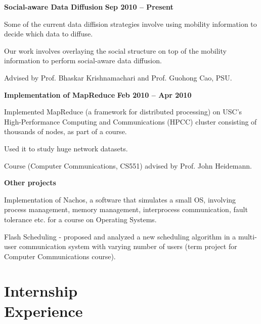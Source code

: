 \documentclass[margin,line]{resume}
\begin{document}
\begin{resume}
  \textbf{Social-aware Data Diffusion} \hfill \textbf{Sep 2010 -- Present}
  \begin{list2}
   \item Some of the current data diffision strategies involve using mobility information to decide which data to diffuse. 
  \newpage
   \item Our work involves overlaying the social structure on top of the mobility information to perform social-aware data diffusion.
   \item Advised by Prof. Bhaskar Krishnamachari and Prof. Guohong Cao, PSU.
  \end{list2}

  \textbf{Implementation of MapReduce} \hfill \textbf{Feb 2010 -- Apr 2010}
  \begin{list2}
  \item Implemented MapReduce (a framework for distributed processing) on USC's High-Performance Computing and Communications (HPCC) cluster consisting of thousands of nodes, as part of a course. 
  \item Used it to study huge network datasets. 
  \item Course (Computer Communications, CS551) advised by Prof. John Heidemann. 
  \end{list2}
 
  \textbf{Other projects} 
  \begin{list2}   
   \item Implementation of Nachos, a software that simulates a small OS, involving process management, memory management, interprocess communication, fault tolerance etc. for a course on Operating Systems.
   \item Flash Scheduling - proposed and analyzed a new scheduling algorithm in a multi-user communication system with varying number of users (term project for Computer Communications course).
  \end{list2}

 
 \vspace{5mm} 
\section{\mysidestyle Internship\\Experience}


\end{resume}
\end{document}
